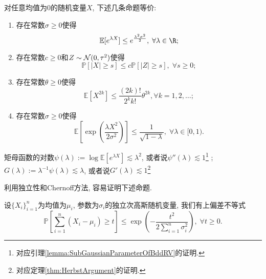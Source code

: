 \begin{theorem}[次高斯随机变量的等价定义]
	对任意均值为$0$的随机变量$X$, 下述几条命题等价: 
	\begin{enumerate}[label=(\Roman*)]
		\item 存在常数$\sigma \geq 0$使得
			\begin{equation*}
				\mathbb{E}[e^{\lambda X} ] \leq e^{\frac{\lambda^2 \sigma^2}{2}},\; \forall \lambda \in \R; 
			\end{equation*}
		\item 存在常数$c \geq 0$和$Z \sim \mathcal{N}(0, \tau^2)$使得
			\begin{equation*}
				\mathbb{P}[|X| \geq s] \leq c \mathbb{P}[|Z| \geq s],\; \forall s \geq 0; 
			\end{equation*}
		\item 存在常数$\theta \geq 0$使得
			\begin{equation*}
				\mathbb{E}[X^{2k}] \leq \frac{(2k)!}{2^k k!} \theta^{2k}, \forall k = 1,2,\dots;
			\end{equation*}
		\item 存在常数$\sigma \geq 0$使得
			\begin{equation*}
				\mathbb{E}\left[ \exp\left(\frac{\lambda X^2}{2 \sigma^2}\right) \right] \leq \frac{1}{\sqrt{1 - \lambda}},\; \forall \lambda \in [0,1).
			\end{equation*}
	\end{enumerate}
\end{theorem}

矩母函数的对数$\psi(\lambda) := \log \mathbb{E}[e^{\lambda X}] \lesssim \lambda^2$, 或者说$\psi''(\lambda) \lesssim 1$\footnote{对应引理\ref{lemma:SubGaussianParameterOfBddRV}的证明. } ; $G(\lambda) := \lambda^{-1} \psi(\lambda) \lesssim \lambda$, 或者说$G'(\lambda) \lesssim 1$\footnote{对应定理\ref{thm:HerbstArgument}的证明. }


利用独立性和Chernoff方法, 容易证明下述命题. 
\begin{proposition}[Hoeffding界]
	设$\{X_i\}_{i=1}^n$为均值为$\mu_i$, 参数为$\sigma_i$的独立次高斯随机变量, 我们有上偏差不等式
	\begin{equation}
		\mathbb{P} \left[ \sum_{i=1}^n (X_i - \mu_i) \geq t \right]
		\leq \exp \left( - \frac{t^2}{2 \sum_{i=1}^n \sigma_i^2} \right ),\; 
		\forall t \geq 0.
	\end{equation}
\end{proposition}


